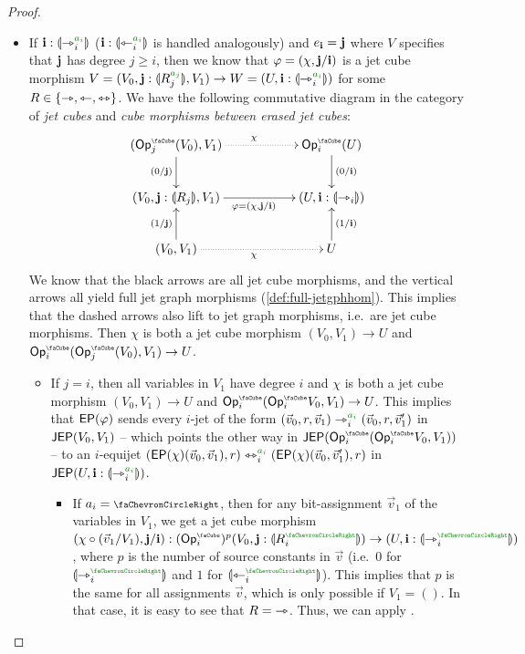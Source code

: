 \documentclass[a4paper]{memoir}
\begin{document}
\begin{proof}
\begin{itemize}
		\item If $\dm i : \rival{\jet_i\pmr{a_i}}$ ($\dm i : \rival{\tej_i\pmr{a_i}}$ is handled analogously) and $e_{\mathbf{i}} = \mathbf{j}$ where $V$ specifies that $\mathbf{j}$ has degree $j \geq i$, then we know that $\varphi = (\chi, \mathbf{j} / \mathbf{i})$ is a jet cube morphism $V = (V_0, \dm j : \rival{R_j\pmr{a_j}}, V_1) \to W = (U, \dm i : \rival{\jet_i\pmr{a_i}})$ for some $R \in \mathopen{}\left\{ \rightarrowtriangle, \leftarrowtriangle, \leftrightarrowtriangle \right\}\mathclose{}$.
		We have the following commutative diagram in the category of \emph{jet cubes} and \emph{cube morphisms between erased jet cubes}:
		\[
			\xymatrix{
				(\Opcube_j(V_0), V_1)
					\ar[d]_{(0/\dm j)}
					\ar@{.>}[rr]^\chi
				&&
				\Opcube_i(U)
					\ar[d]^{(0/\dm i)}
				\\
				(V_0, \dm j : \rival{R_j}, V_1)
					\ar[rr]_{\vfi = (\chi, \dm j / \dm i)}
				&& (U, \dm i : \rival{\jet_i})
				\\
				(V_0, V_1)
					\ar[u]^{(1/\dm j)}
					\ar@{.>}[rr]_\chi
				&&
				U
					\ar[u]_{(1/\dm i)}
			}
		\]
		We know that the black arrows are all jet cube morphisms, and the vertical arrows all yield full jet graph morphisms (\cref{def:full-jetgphhom}).
		This implies that the dashed arrows also lift to jet graph morphisms, i.e.\ are jet cube morphisms.
		Then $\chi$ is both a jet cube morphism $(V_0, V_1) \to U$ and $\Opcube_i(\Opcube_j(V_0), V_1) \to U$.
		\begin{itemize}
			\item If $j = i$, then all variables in $V_1$ have degree $i$ and $\chi$ is both a jet cube morphism $(V_0, V_1) \to U$ and $\Opcube_i(\Opcube_i V_0, V_1) \to U$.
			This implies that $\mathsf{EP}(\varphi)$ sends every $i$-jet of the form $(\vec v_0, r, \vec v_1) \jet_i\pmr{a_i} (\vec v_0, r, \vec v_1')$ in $\mathsf{JEP}(V_0, V_1)$ -- which points the other way in $\JEP(\Opcube_i(\Opcube_i V_0, V_1))$ -- to an $i$-equijet $(\EP(\chi)(\vec v_0, \vec v_1), r) \equijet_i\pmr{a_i} (\EP(\chi)(\vec v_0, \vec v'_1), r)$ in $\JEP(U, \dm i : \rival{\jet_i\pmr{a_i}})$.
			\begin{itemize}
				\item If $a_i = \ypolar$, then for any bit-assignment $\vec v_1$ of the variables in $V_1$, we get a jet cube morphism $(\chi \circ (\vec v_1/V_1), \dm j / \dm i) : (\Opcube_i)^p(V_0, \dm j : \rival{R_i\pmr{\ypolar}}) \to (U, \dm i : \rival{\jet_i\pmr{\ypolar}})$, where $p$ is the number of source constants in $\vec v$ (i.e.\ $0$ for $\rival{\jet_i\pmr{\ypolar}}$ and $1$ for $\rival{\tej_i\pmr{\ypolar}}$).
				This implies that $p$ is the same for all assignments $\vec v$, which is only possible if $V_1 = ()$.
				In that case, it is easy to see that $R = {\rightarrowtriangle}$.
				Thus, we can apply .
				

\end{itemize}
\end{itemize}
\end{itemize}
\end{proof}
\end{document}

